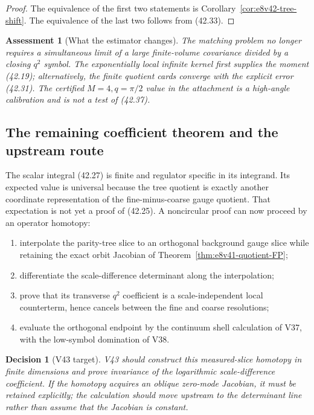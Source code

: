 \documentclass[11pt,oneside]{book}
\newtheorem{assessment}[theorem]{Assessment}
\newtheorem{decision}[theorem]{Decision}
\theoremstyle{definition}
\theoremstyle{remark}
\begin{document}
\begin{proof}
The equivalence of the first two statements is
Corollary~\ref{cor:e8v42-tree-shift}.  The equivalence of the last
two follows from (42.33).
\end{proof}

\begin{assessment}[What the estimator changes]
\label{ass:e8v42-estimator-scope}
The matching problem no longer requires a simultaneous limit of a
large finite-volume covariance divided by a closing \(q^2\) symbol.
The exponentially local infinite kernel first supplies the moment
(42.19); alternatively, the finite quotient cards converge with the
explicit error (42.31).  The certified \(M=4,q=\pi/2\) value in the
attachment is a high-angle calibration and is not a test of
(42.37).
\end{assessment}

\subsection{The remaining coefficient theorem and the upstream route}

The scalar integral (42.27) is finite and regulator specific in its
integrand.  Its expected value is universal because the tree
quotient is exactly another coordinate representation of the
fine-minus-coarse gauge quotient.  That expectation is not yet a
proof of (42.25).  A noncircular proof can now proceed by an operator
homotopy:
\begin{enumerate}
\item interpolate the parity-tree slice to an orthogonal
      background gauge slice while retaining the exact orbit
      Jacobian of Theorem~\ref{thm:e8v41-quotient-FP};
\item differentiate the scale-difference determinant along the
      interpolation;
\item prove that its transverse \(q^2\) coefficient is a
      scale-independent local counterterm, hence cancels between the
      fine and coarse resolutions;
\item evaluate the orthogonal endpoint by the continuum shell
      calculation of V37, with the low-symbol domination of V38.
\end{enumerate}

\begin{decision}[V43 target]
\label{dec:e8v42-next}
V43 should construct this measured-slice homotopy in finite
dimensions and prove invariance of the logarithmic scale-difference
coefficient.  If the homotopy acquires an oblique zero-mode
Jacobian, it must be retained explicitly; the calculation should
move upstream to the determinant line rather than assume that the
Jacobian is constant.
\end{decision}
\end{document}
